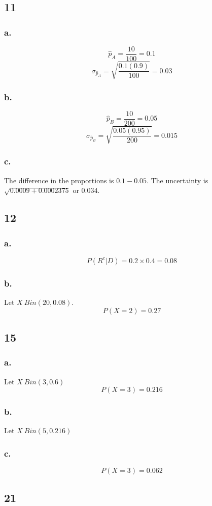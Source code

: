 \documentclass[11pt]{article}
\begin{document}
\subsection{11}
\subsubsection{a.}
\[\hat{p}_A = \frac{10}{100} = 0.1 \] 
\[\sigma_{\hat{p}_A} = \sqrt{\frac{0.1(0.9)}{100}} = 0.03 \]
\subsubsection{b.}
\[\hat{p}_B = \frac{10}{200} = 0.05 \]
\[\sigma_{\hat{p}_B} = \sqrt{\frac{0.05(0.95)}{200}} = 0.015 \]
\subsubsection{c.}
The difference in the proportions is $0.1 - 0.05$. The uncertainty is
$\sqrt{0.0009 + 0.0002375}$ or $0.034$.
\subsection{12}
\subsubsection{a.}
\[ P(R^c|D) = 0.2 \times 0.4 = 0.08 \]
\subsubsection{b.}
Let $X~Bin(20, 0.08)$.
\[ P(X=2) = 0.27 \]
\subsection{15}
\subsubsection{a.}
Let $X~Bin(3, 0.6)$
\[ P(X=3)=0.216 \]
\subsubsection{b.}
Let $X~Bin(5, 0.216)$
\subsubsection{c.}
\[ P(X=3) = 0.062 \]

\subsection{21}
\end{document}
